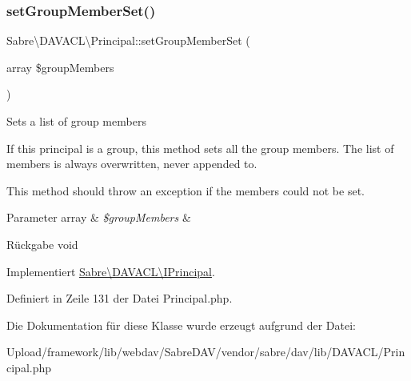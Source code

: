 \subsubsection{\texorpdfstring{set\+Group\+Member\+Set()}{setGroupMemberSet()}}
{\footnotesize\ttfamily Sabre\textbackslash{}\+D\+A\+V\+A\+C\+L\textbackslash{}\+Principal\+::set\+Group\+Member\+Set (\begin{DoxyParamCaption}\item[{array}]{\$group\+Members }\end{DoxyParamCaption})}

Sets a list of group members

If this principal is a group, this method sets all the group members. The list of members is always overwritten, never appended to.

This method should throw an exception if the members could not be set.


\begin{DoxyParams}[1]{Parameter}
array & {\em \$group\+Members} & \\
\hline
\end{DoxyParams}
\begin{DoxyReturn}{Rückgabe}
void 
\end{DoxyReturn}


Implementiert \mbox{\hyperlink{interface_sabre_1_1_d_a_v_a_c_l_1_1_i_principal_a9dfeb1ed9f70016333ef2b0ec1753677}{Sabre\textbackslash{}\+D\+A\+V\+A\+C\+L\textbackslash{}\+I\+Principal}}.



Definiert in Zeile 131 der Datei Principal.\+php.



Die Dokumentation für diese Klasse wurde erzeugt aufgrund der Datei\+:\begin{DoxyCompactItemize}
\item 
Upload/framework/lib/webdav/\+Sabre\+D\+A\+V/vendor/sabre/dav/lib/\+D\+A\+V\+A\+C\+L/Principal.\+php\end{DoxyCompactItemize}
